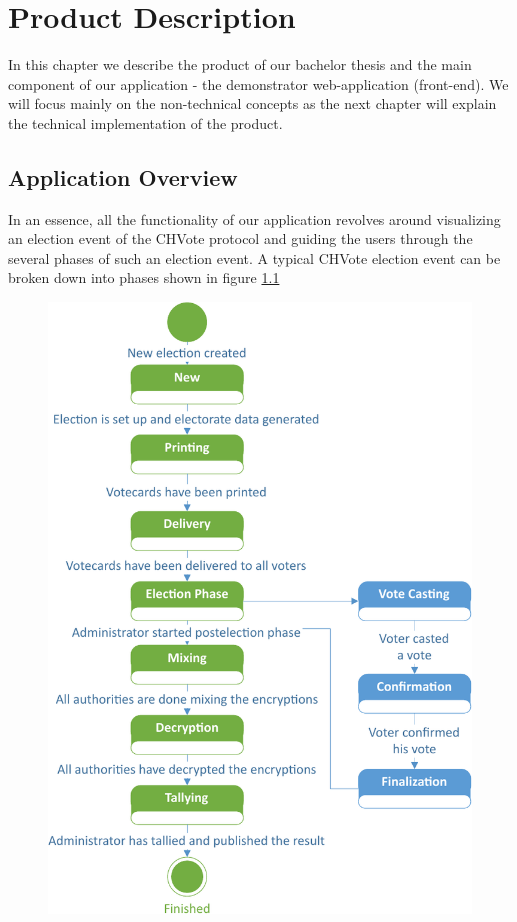 \chapter{Product Description}
In this chapter we describe the product of our bachelor thesis and the main component of our application - the demonstrator web-application (front-end). We will focus mainly on the non-technical concepts as the next chapter will explain the technical implementation of the product.

\section{Application Overview}
In an essence, all the functionality of our application revolves around visualizing an election event of the CHVote protocol and guiding the users through the several phases of such an election event. A typical CHVote election event can be broken down into phases shown in figure \ref{Phases of an election-event}

\begin{figure}
\begin{center}
\includegraphics[scale=0.65]{assets/electionStatediagram.pdf}
\label{Phases of an election-event}%
\end{center}
\end{figure}

